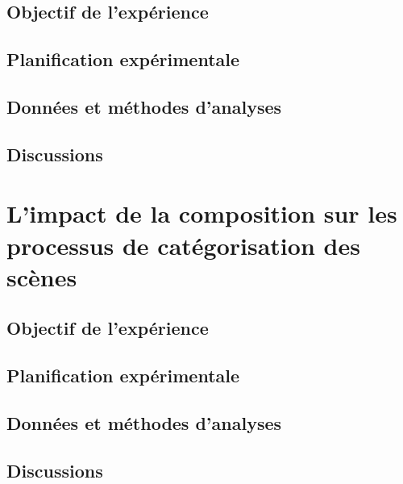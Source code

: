 \subsection{Objectif de l'expérience}

\subsection{Planification expérimentale}

\subsection{Données et méthodes d'analyses}

\subsection{Discussions}

\section{L'impact de la composition sur les processus de catégorisation des scènes}
\label{sec:xp4}

\subsection{Objectif de l'expérience}

\subsection{Planification expérimentale}

\subsection{Données et méthodes d'analyses}

\subsection{Discussions}




